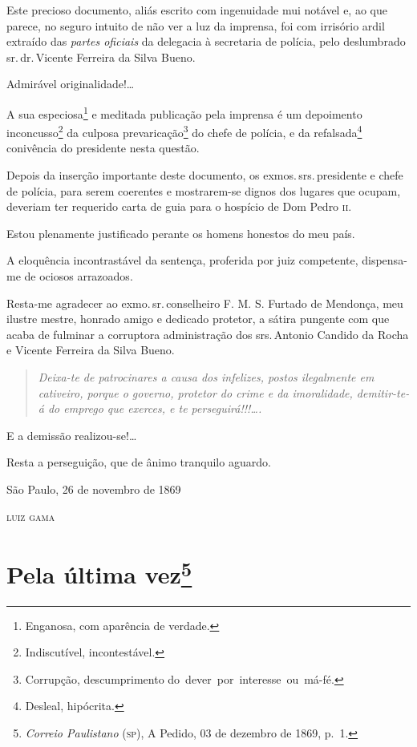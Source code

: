 Este precioso documento, aliás escrito com ingenuidade mui notável e, ao
que parece, no seguro intuito de não ver a luz da imprensa, foi com
irrisório ardil extraído das \emph{partes oficiais} da delegacia à
secretaria de polícia, pelo deslumbrado sr.\,dr.\,Vicente Ferreira da
Silva Bueno.

Admirável originalidade!\ldots{}

A sua especiosa\footnote{Enganosa, com aparência de verdade.} e
meditada publicação pela imprensa é um depoimento inconcusso\footnote{
  Indiscutível, incontestável.} da culposa prevaricação\footnote{
  Corrupção, descumprimento do~dever~por~interesse~ou~má-fé.} do chefe
de polícia, e da refalsada\footnote{Desleal, hipócrita.} conivência do
presidente nesta questão.

Depois da inserção importante deste documento, os exmos.\,srs.\,presidente
e chefe de polícia, para serem coerentes e mostrarem-se dignos dos
lugares que ocupam, deveriam ter requerido carta de guia para o hospício
de Dom Pedro \textsc{ii}.

Estou plenamente justificado perante os homens honestos do meu país.

A eloquência incontrastável da sentença, proferida por juiz competente,
dispensa-me de ociosos arrazoados.

Resta-me agradecer ao exmo.\,sr.\,conselheiro F. M. S. Furtado de
Mendonça, meu ilustre mestre, honrado amigo e dedicado protetor, a
sátira pungente com que acaba de fulminar a corruptora administração dos
srs.\,Antonio Candido da Rocha e Vicente Ferreira da Silva Bueno.

\begin{quote}
\emph{Deixa-te de patrocinares a causa dos infelizes, postos
ilegalmente em cativeiro, porque o governo, protetor do crime e da
imoralidade, demitir-te-á do emprego que exerces, e te
perseguirá!!!\ldots{}.}
\end{quote}

E a demissão realizou-se!\ldots{}

Resta a perseguição, que de ânimo tranquilo aguardo.

\begin{flushright}
São Paulo, 26 de novembro de 1869

\textsc{luiz gama}
\end{flushright}

\chapter{Pela última vez\footnote{\emph{Correio Paulistano} (\textsc{sp}), A
  Pedido, 03 de dezembro de 1869, p.~1.}}


